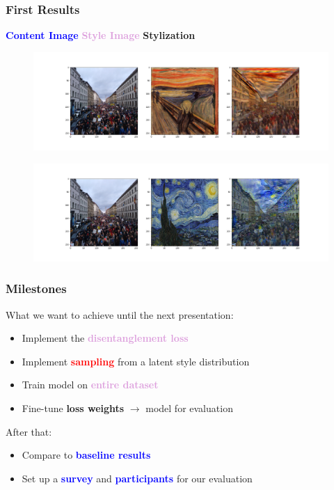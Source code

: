 \documentclass[11pt,xcolor=dvipsnames]{beamer}
\begin{document}
\begin{frame}
\frametitle{First Results}

\begin{center}
\textcolor{blue}{\textbf{Content Image}} \hspace{0.5cm}  \textcolor{Plum}{\textbf{Style Image}} \hspace{0.75cm} \textbf{Stylization}

\begin{figure}
	\includegraphics[width=1.0\linewidth]{scream_adain_3001.png}
\end{figure}

\vspace{-1cm}

\begin{figure}
	\includegraphics[width=1.0\linewidth]{starry_night_relu4_1e-2_lr1e-4.png}
\end{figure}

\end{center}

\end{frame}

\begin{frame}
\frametitle{Milestones}

What we want to achieve until the next presentation:
	\vspace{10pt}
\begin{itemize}
	\item Implement the \textcolor{Plum}{\textbf{disentanglement loss}}
	\item Implement \textcolor{red}{\textbf{sampling}} from a latent style distribution
	\item Train model on \textbf{\textcolor{Plum}{entire dataset}}
	\item Fine-tune \textbf{loss weights} $\rightarrow$ model for evaluation
\end{itemize}

After that:	
	\begin{itemize}
	\item Compare to \textbf{\textcolor{blue}{baseline results}}
	\item Set up a \textcolor{blue}{\textbf{survey}} and \textcolor{blue}{\textbf{participants}} for our evaluation
	\end{itemize}
\end{frame}
\end{document}
